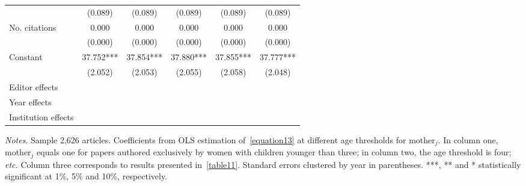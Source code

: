 \begin{table}[H]
\begin{threeparttable}
\begin{tabular}{p{4cm}SSSSS}
                                          &     (0.089)   &     (0.089)   &     (0.089)   &     (0.089)   &     (0.089)   \\
            No. citations                 &       0.000   &       0.000   &       0.000   &       0.000   &       0.000   \\
                                          &     (0.000)   &     (0.000)   &     (0.000)   &     (0.000)   &     (0.000)   \\
            Constant                      &      37.752***&      37.854***&      37.880***&      37.855***&      37.777***\\
                                          &     (2.052)   &     (2.053)   &     (2.055)   &     (2.058)   &     (2.048)   \\
            \midrule
            Editor effects                &           {}   &           {}   &           {}   &           {}   &           {}   \\
            Year effects                  &           {}   &           {}   &           {}   &           {}   &           {}   \\
            Institution effects           &           {}   &           {}   &           {}   &           {}   &           {}   \\
            \bottomrule
        \end{tabular}
        \begin{tablenotes}
            \tiny
            \item \textit{Notes}. Sample 2,626 articles. Coefficients from OLS estimation of~\autoref{equation13} at different age thresholds for \(\text{mother}_j\). In column one, \(\text{mother}_j\) equals one for papers authored exclusively by women with children younger than three; in column two, the age threshold is four; \textit{etc.} Column three corresponds to results presented in~\autoref{table11}. Standard errors clustered by year in parentheses. ***, ** and * statistically significant at 1\%, 5\% and 10\%, respectively.
        \end{tablenotes}
    \end{threeparttable}
\end{table}